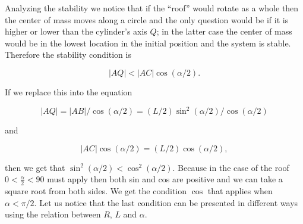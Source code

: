{Analyzing the stability we notice that if the “roof” would rotate as a whole then the center of mass moves along a circle and the only question would be if it is higher or lower than the cylinder’s axis $Q$; in the latter case the center of mass would be in the lowest location in the initial position and the system is stable. Therefore the stability condition is

$$|AQ|<|AC|\cos(\alpha/2).$$

If we replace this into the equation

$$|AQ|=|AB|/\cos(\alpha/2)=(L/2)\sin^2(\alpha/2)/\cos(\alpha/2)$$

and 

$$|AC|\cos(\alpha/2)=(L/2)\cos(\alpha/2),$$

then we get that $\sin^2(\alpha /2) < \cos ^2(\alpha /2)$. Because in the case of the roof $0<\frac{\alpha}{2}<90$ must apply then both sin and cos are positive and we can take a square root from both sides. We get the condition $\cos$ that applies when $\alpha<\pi/2$. Let us notice that the last condition can be presented in different ways using the relation between $R$, $L$ and $\alpha$.
\fi
}